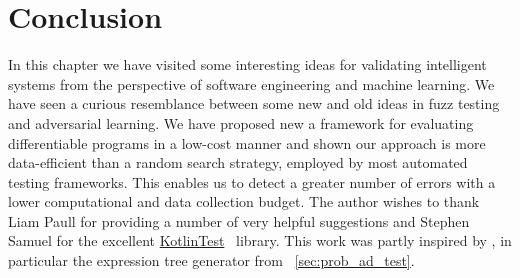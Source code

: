 
\section{Conclusion}

In this chapter we have visited some interesting ideas for validating intelligent systems from the perspective of software engineering and machine learning. We have seen a curious resemblance between some new and old ideas in fuzz testing and adversarial learning. We have proposed new a framework for evaluating differentiable programs in a low-cost manner and shown our approach is more data-efficient than a random search strategy, employed by most automated testing frameworks. This enables us to detect a greater number of errors with a lower computational and data collection budget. The author wishes to thank Liam Paull for providing a number of very helpful suggestions and Stephen Samuel for the excellent \href{https://github.com/kotlintest/kotlintest}{KotlinTest}~\citep{kotlintest} library. This work was partly inspired by \citet{lample2019deep}, in particular the expression tree generator from ~\autoref{sec:prob_ad_test}.